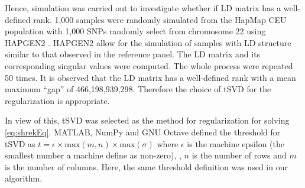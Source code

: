 			Hence, simulation was carried out to investigate whether if \gls{LD} matrix has a well-defined rank.
			1,000 samples were randomly simulated from the HapMap \citep{Altshuler2010} \gls{CEU} population with 1,000 \glspl{SNP} randomly select from chromosome 22 using HAPGEN2 \citep{Su2011}.
			HAPGEN2 allow for the simulation of samples with \gls{LD} structure similar to that observed in the reference panel.
			The \gls{LD} matrix and its corresponding singular values were computed. 
			The whole process were repeated 50 times. 
			It is observed that the \gls{LD} matrix has a well-defined rank with a mean maximum ``gap'' of 466,198,939,298.
			Therefore the choice of \gls{tSVD} for the regularization is appropriate.
			
			In view of this, \gls{tSVD} was selected as the method for regularization for solving \cref{eq:shrekEq}.
			MATLAB, NumPy and GNU Octave defined the threshold for \gls{tSVD} as $t=\epsilon\times \mathrm{max}(m,n)\times \mathrm{max}(\sigma)$ where $\epsilon$ is the machine epsilon (the smallest number a machine define as non-zero), , $n$ is the number of rows and $m$ is the number of columns. 
			Here, the same threshold definition was used in our algorithm.
			
